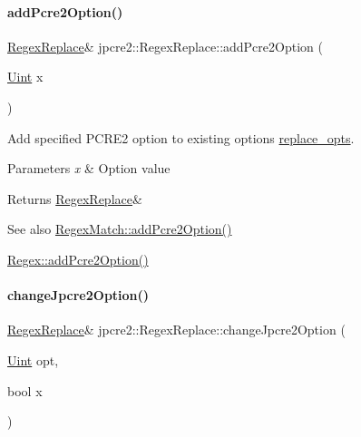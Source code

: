 \paragraph{\texorpdfstring{add\+Pcre2\+Option()}{addPcre2Option()}}
{\footnotesize\ttfamily \hyperlink{classjpcre2_1_1RegexReplace}{Regex\+Replace}\& jpcre2\+::\+Regex\+Replace\+::add\+Pcre2\+Option (\begin{DoxyParamCaption}\item[{\hyperlink{namespacejpcre2_a078242d38221a13fb3543b9edd78c099}{Uint}}]{x }\end{DoxyParamCaption})\hspace{0.3cm}{\ttfamily [inline]}}



Add specified P\+C\+R\+E2 option to existing options \hyperlink{classjpcre2_1_1RegexReplace_afc79699cfcad8b7cbb26864b6b67cdc7}{replace\+\_\+opts}. 


\begin{DoxyParams}{Parameters}
{\em x} & Option value \\
\hline
\end{DoxyParams}
\begin{DoxyReturn}{Returns}
\hyperlink{classjpcre2_1_1RegexReplace}{Regex\+Replace}\& 
\end{DoxyReturn}
\begin{DoxySeeAlso}{See also}
\hyperlink{classjpcre2_1_1RegexMatch_aac4857cd8f5eae15b29b9afbe9023522_aac4857cd8f5eae15b29b9afbe9023522}{Regex\+Match\+::add\+Pcre2\+Option()} 

\hyperlink{classjpcre2_1_1Regex_a2c7dcf12f26b2b046e147b013c8b5087_a2c7dcf12f26b2b046e147b013c8b5087}{Regex\+::add\+Pcre2\+Option()} 
\end{DoxySeeAlso}
\hypertarget{classjpcre2_1_1RegexReplace_afebf5e76bce8e312ab6dbdec3288b02b_afebf5e76bce8e312ab6dbdec3288b02b}{}\label{classjpcre2_1_1RegexReplace_afebf5e76bce8e312ab6dbdec3288b02b_afebf5e76bce8e312ab6dbdec3288b02b} 
\paragraph{\texorpdfstring{change\+Jpcre2\+Option()}{changeJpcre2Option()}}
{\footnotesize\ttfamily \hyperlink{classjpcre2_1_1RegexReplace}{Regex\+Replace}\& jpcre2\+::\+Regex\+Replace\+::change\+Jpcre2\+Option (\begin{DoxyParamCaption}\item[{\hyperlink{namespacejpcre2_a078242d38221a13fb3543b9edd78c099}{Uint}}]{opt,  }\item[{bool}]{x }\end{DoxyParamCaption})\hspace{0.3cm}{\ttfamily [inline]}}



